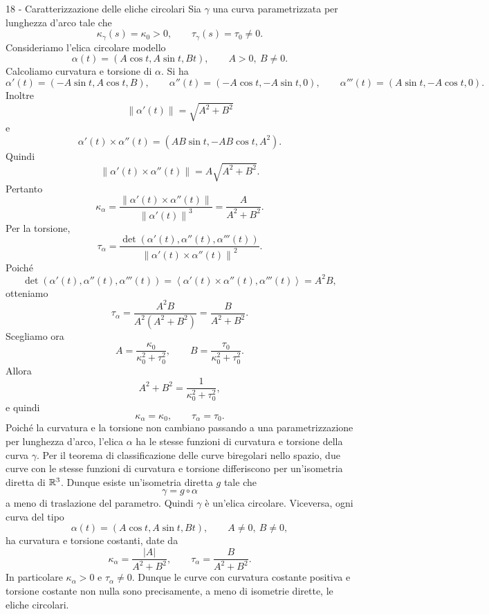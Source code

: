 \documentclass[a4paper]{article}
\begin{document}
\begin{snippetsolution}{18 - Caratterizzazione delle eliche circolari}
    Sia \(\gamma\) una curva parametrizzata per lunghezza d'arco tale che
    \[
        \kappa_\gamma(s)=\kappa_0>0,
        \qquad
        \tau_\gamma(s)=\tau_0\neq0.
    \]
    Consideriamo l'elica circolare modello
    \[
        \alpha(t)=(A\cos t,A\sin t,Bt),
        \qquad A>0,\ B\neq0.
    \]
    Calcoliamo curvatura e torsione di \(\alpha\). Si ha
    \[
        \alpha'(t)=(-A\sin t,A\cos t,B),
        \qquad
        \alpha''(t)=(-A\cos t,-A\sin t,0),
        \qquad
        \alpha'''(t)=(A\sin t,-A\cos t,0).
    \]
    Inoltre
    \[
        \left\|\alpha'(t)\right\|=\sqrt{A^2+B^2}
    \]
    e
    \[
        \alpha'(t)\times\alpha''(t)
        =
        \left(
            AB\sin t,
            -AB\cos t,
            A^2
        \right).
    \]
    Quindi
    \[
        \left\|\alpha'(t)\times\alpha''(t)\right\|
        =
        A\sqrt{A^2+B^2}.
    \]
    Pertanto
    \[
        \kappa_\alpha
        =
        \frac{\left\|\alpha'(t)\times\alpha''(t)\right\|}{\left\|\alpha'(t)\right\|^3}
        =
        \frac{A}{A^2+B^2}.
    \]
    Per la torsione,
    \[
        \tau_\alpha
        =
        \frac{\det(\alpha'(t),\alpha''(t),\alpha'''(t))}{\left\|\alpha'(t)\times\alpha''(t)\right\|^2}.
    \]
    Poiché
    \[
        \det(\alpha'(t),\alpha''(t),\alpha'''(t))
        =
        \left\langle
            \alpha'(t)\times\alpha''(t),
            \alpha'''(t)
        \right\rangle
        =
        A^2B,
    \]
    otteniamo
    \[
        \tau_\alpha
        =
        \frac{A^2B}{A^2(A^2+B^2)}
        =
        \frac{B}{A^2+B^2}.
    \]
    Scegliamo ora
    \[
        A=\frac{\kappa_0}{\kappa_0^2+\tau_0^2},
        \qquad
        B=\frac{\tau_0}{\kappa_0^2+\tau_0^2}.
    \]
    Allora
    \[
        A^2+B^2=\frac{1}{\kappa_0^2+\tau_0^2},
    \]
    e quindi
    \[
        \kappa_\alpha=\kappa_0,
        \qquad
        \tau_\alpha=\tau_0.
    \]
    Poiché la curvatura e la torsione non cambiano passando a una parametrizzazione per lunghezza d'arco, l'elica \(\alpha\) ha le stesse funzioni di curvatura e torsione della curva \(\gamma\).
    Per il teorema di classificazione delle curve biregolari nello spazio, due curve con le stesse funzioni di curvatura e torsione differiscono per un'isometria diretta di \(\mathbb{R}^3\). Dunque esiste un'isometria diretta \(g\) tale che
    \[
        \gamma=g\circ\alpha
    \]
    a meno di traslazione del parametro. Quindi \(\gamma\) è un'elica circolare.
    Viceversa, ogni curva del tipo
    \[
        \alpha(t)=(A\cos t,A\sin t,Bt),
        \qquad A\neq0,\ B\neq0,
    \]
    ha curvatura e torsione costanti, date da
    \[
        \kappa_\alpha=\frac{|A|}{A^2+B^2},
        \qquad
        \tau_\alpha=\frac{B}{A^2+B^2}.
    \]
    In particolare \(\kappa_\alpha>0\) e \(\tau_\alpha\neq0\). Dunque le curve con curvatura costante positiva e torsione costante non nulla sono precisamente, a meno di isometrie dirette, le eliche circolari.
\end{snippetsolution}
\end{document}
